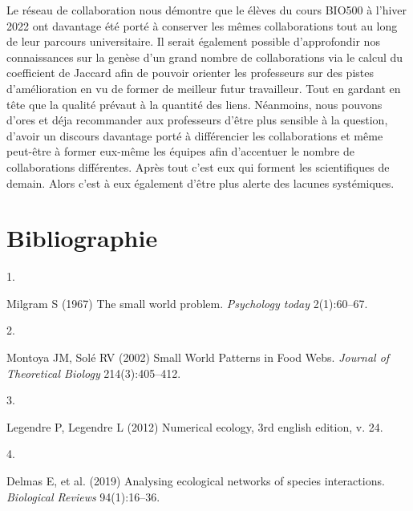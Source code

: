 \documentclass[9pt,twocolumn,twoside,]{pnas-new}
\newlength{\cslhangindent}
\newlength{\csllabelwidth}
\newlength{\cslentryspacingunit} %
\newenvironment{CSLReferences}[2] %
 {%
  \setlength{\parindent}{0pt}
  \ifodd #1
  \let\oldpar\par
  \def\par{\hangindent=\cslhangindent\oldpar}
  \fi
  \setlength{\parskip}{#2\cslentryspacingunit}
 }%
 {}
\newcommand{\CSLLeftMargin}[1]{\parbox[t]{\csllabelwidth}{#1}}
\newcommand{\CSLRightInline}[1]{\parbox[t]{\linewidth - \csllabelwidth}{#1}\break}
\begin{document}
Le réseau de collaboration nous démontre que le élèves du cours BIO500 à
l'hiver 2022 ont davantage été porté à conserver les mêmes
collaborations tout au long de leur parcours universitaire. Il serait
également possible d'approfondir nos connaissances sur la genèse d'un
grand nombre de collaborations via le calcul du coefficient de Jaccard
afin de pouvoir orienter les professeurs sur des pistes d'amélioration
en vu de former de meilleur futur travailleur. Tout en gardant en tête
que la qualité prévaut à la quantité des liens. Néanmoins, nous pouvons
d'ores et déja recommander aux professeurs d'être plus sensible à la
question, d'avoir un discours davantage porté à différencier les
collaborations et même peut-être à former eux-même les équipes afin
d'accentuer le nombre de collaborations différentes. Après tout c'est
eux qui forment les scientifiques de demain. Alors c'est à eux également
d'être plus alerte des lacunes systémiques.

\newpage

\hypertarget{bibliographie}{%
\section*{Bibliographie}\label{bibliographie}}

\hypertarget{refs}{}
\begin{CSLReferences}{0}{0}
\leavevmode\hypertarget{ref-milgram1967small}{}%
\CSLLeftMargin{1. }
\CSLRightInline{Milgram S (1967) The small world problem.
\emph{Psychology today} 2(1):60--67.}

\leavevmode\hypertarget{ref-montoya2002small}{}%
\CSLLeftMargin{2. }
\CSLRightInline{Montoya JM, Solé RV (2002) Small {World} {Patterns} in
{Food} {Webs}. \emph{Journal of Theoretical Biology} 214(3):405--412.}

\leavevmode\hypertarget{ref-legendre2012numerical}{}%
\CSLLeftMargin{3. }
\CSLRightInline{Legendre P, Legendre L (2012) Numerical ecology, 3rd
english edition, v. 24.}

\leavevmode\hypertarget{ref-delmas2019analysing}{}%
\CSLLeftMargin{4. }
\CSLRightInline{Delmas E, et al. (2019) Analysing ecological networks of
species interactions. \emph{Biological Reviews} 94(1):16--36.}

\end{CSLReferences}



% 
\end{document}
